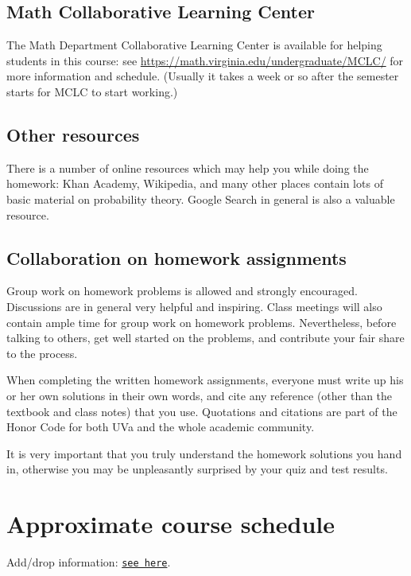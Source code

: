 \documentclass[oneside,11pt]{amsart}
\begin{document}
\subsection{Math Collaborative Learning Center}

The Math Department 
Collaborative Learning Center
is available for helping students in this course: 
see \url{https://math.virginia.edu/undergraduate/MCLC/}
for more information and schedule. 
(Usually it takes a week or so after the semester starts for MCLC to start working.)

\subsection{Other resources}

There is a number of online resources which may help you while doing the homework:
Khan Academy, Wikipedia, and many other 
places contain lots of basic material on probability theory. Google Search
in general
is also a valuable resource.

\subsection{Collaboration on homework assignments}
\label{collaboration}

Group work on homework problems is allowed and strongly encouraged.
Discussions are in general very
helpful and inspiring. Class meetings will also contain ample time
for group work on homework problems.
Nevertheless, before talking to others, get well started
on the problems, and contribute your fair share to the process. 

When completing the written homework assignments, everyone must write up his or her own
solutions in their own words, and cite any reference 
(other than the textbook and
class notes) that you use. Quotations and citations are part of the Honor Code for both UVa
and the whole academic community. 

It is very important that you truly understand the homework solutions you hand
in, otherwise you may be unpleasantly surprised by your quiz and test results.

\section{Approximate course schedule}
\label{sub:schedule}

\noindent Add/drop information: \href{https://registrar.virginia.edu/enrollment-information/spring-2022-enrollment-instruction}{\texttt{see here}}.
\bigskip
\end{document}
